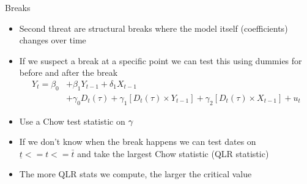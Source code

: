 \documentclass[aspectratio=169]{beamer}
\begin{document}
\begin{frame}{Breaks}
    \begin{itemize}
        \item Second threat are structural breaks where the model itself (coefficients) changes over time
        \item If we suspect a break at a specific point we can test this using dummies for before and after the break
        $$
        \begin{aligned}
            Y_t=\beta_0 & +\beta_1 Y_{t-1}+\delta_1 X_{t-1} \\
            & +\gamma_0 D_t(\tau)+\gamma_1\left[D_t(\tau) \times Y_{t-1}\right]+\gamma_2\left[D_t(\tau) \times X_{t-1}\right]+u_t
            \end{aligned}
        $$
        \item Use a Chow test statistic on $\bf{\gamma}$
        \item If we don't know when the break happens we can test dates on $\underline{t} <= t <= \bar{t}$ and take the largest Chow statistic (QLR statistic)
        \item The more QLR stats we compute, the larger the critical value
    \end{itemize}
\end{frame}

\end{document}
